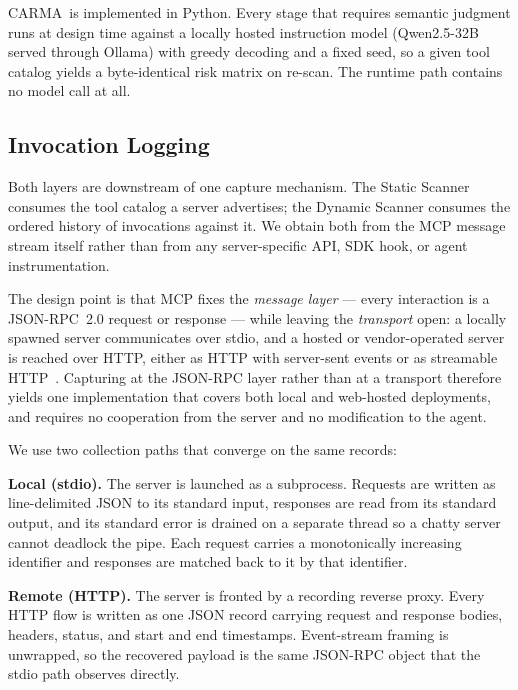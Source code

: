 \documentclass[sigconf]{acmart}
\newcommand{\frameworkname}{\textsc{CARMA}}
\begin{document}
\frameworkname\ is implemented in Python. Every stage that requires semantic
judgment runs at design time against a locally hosted instruction model
(Qwen2.5-32B served through Ollama) with greedy decoding and a fixed seed, so a
given tool catalog yields a byte-identical risk matrix on re-scan. The runtime
path contains no model call at all.


\subsection{Invocation Logging}
\label{sec:impl-logging}

Both layers are downstream of one capture mechanism. The Static Scanner
consumes the tool catalog a server advertises; the Dynamic Scanner consumes the
ordered history of invocations against it. We obtain both from the MCP message
stream itself rather than from any server-specific API, SDK hook, or agent
instrumentation.

The design point is that MCP fixes the \emph{message layer} --- every
interaction is a JSON-RPC~2.0 request or response --- while leaving the
\emph{transport} open: a locally spawned server communicates over stdio, and a
hosted or vendor-operated server is reached over HTTP, either as HTTP with
server-sent events or as streamable HTTP~\cite{mcp2026spec}. Capturing at the
JSON-RPC layer rather than at a transport therefore yields one implementation
that covers both local and web-hosted deployments, and requires no cooperation
from the server and no modification to the agent.

We use two collection paths that converge on the same records:

\textbf{Local (stdio).} The server is launched as a subprocess. Requests are
written as line-delimited JSON to its standard input, responses are read from
its standard output, and its standard error is drained on a separate thread so
a chatty server cannot deadlock the pipe. Each request carries a monotonically
increasing identifier and responses are matched back to it by that identifier.

\textbf{Remote (HTTP).} The server is fronted by a recording reverse proxy.
Every HTTP flow is written as one JSON record carrying request and response
bodies, headers, status, and start and end timestamps. Event-stream framing is
unwrapped, so the recovered payload is the same JSON-RPC object that the stdio
path observes directly.
\end{document}

